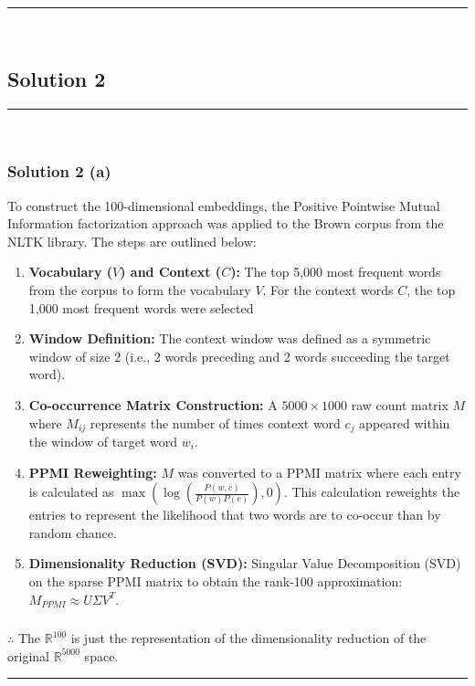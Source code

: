 \documentclass{article}
\begin{document}
\noindent\rule{\textwidth}{0.4pt}\\
\newpage

\subsection*{Solution 2}
\noindent\rule{\textwidth}{0.4pt}\\
\subsubsection*{Solution 2 (a)}

To construct the 100-dimensional embeddings, the Positive Pointwise Mutual Information factorization approach was applied to the Brown corpus from the NLTK library. The steps are outlined below:

\begin{enumerate}
    \item \textbf{Vocabulary ($V$) and Context ($C$):} The top 5,000 most frequent words from the corpus to form the vocabulary $V$. For the context words $C$, the top 1,000 most frequent words were selected
    \item \textbf{Window Definition:} The context window was defined as a symmetric window of size 2 (i.e., 2 words preceding and 2 words succeeding the target word).
    \item \textbf{Co-occurrence Matrix Construction:} A $5000 \times 1000$ raw count matrix $M$ where $M_{ij}$ represents the number of times context word $c_j$ appeared within the window of target word $w_i$.
    \item \textbf{PPMI Reweighting:} $M$ was converted to a PPMI matrix where each entry is calculated as $\max(\log(\frac{P(w,c)}{P(w)P(c)}), 0)$. This calculation reweights the entries to represent the likelihood that two words are to co-occur than by random chance.
    \item \textbf{Dimensionality Reduction (SVD):} Singular Value Decomposition (SVD) on the sparse PPMI matrix to obtain the rank-100 approximation: $M_{PPMI} \approx U \Sigma V^T$. 
\end{enumerate}

\subsubsection*{\normalfont}{$\therefore$ The $\mathbb{R}^{100}$ is just the representation of the dimensionality reduction of the original $\mathbb{R}^{5000}$ space.}
\noindent\rule{\textwidth}{0.4pt}\\
\newpage
\end{document}
